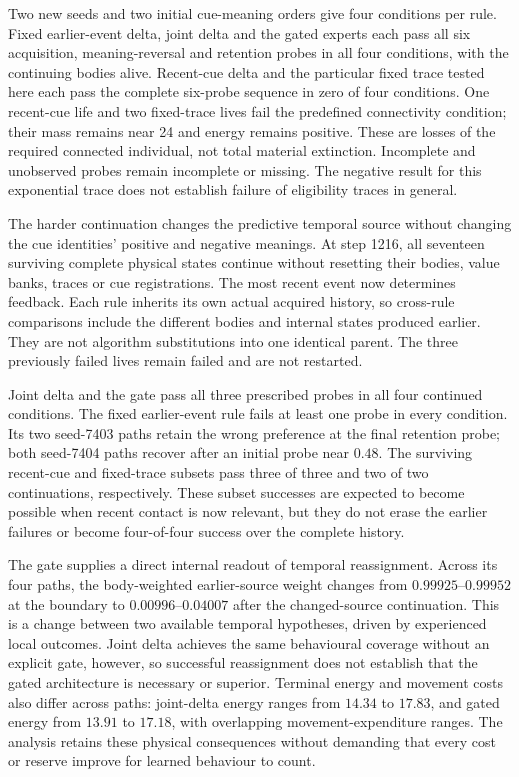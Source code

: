 Two new seeds and two initial cue-meaning orders give four conditions per rule. Fixed earlier-event delta, joint delta and the gated experts each pass all six acquisition, meaning-reversal and retention probes in all four conditions, with the continuing bodies alive. Recent-cue delta and the particular fixed trace tested here each pass the complete six-probe sequence in zero of four conditions. One recent-cue life and two fixed-trace lives fail the predefined connectivity condition; their mass remains near 24 and energy remains positive. These are losses of the required connected individual, not total material extinction. Incomplete and unobserved probes remain incomplete or missing. The negative result for this exponential trace does not establish failure of eligibility traces in general.

The harder continuation changes the predictive temporal source without changing the cue identities' positive and negative meanings. At step 1216, all seventeen surviving complete physical states continue without resetting their bodies, value banks, traces or cue registrations. The most recent event now determines feedback. Each rule inherits its own actual acquired history, so cross-rule comparisons include the different bodies and internal states produced earlier. They are not algorithm substitutions into one identical parent. The three previously failed lives remain failed and are not restarted.

Joint delta and the gate pass all three prescribed probes in all four continued conditions. The fixed earlier-event rule fails at least one probe in every condition. Its two seed-7403 paths retain the wrong preference at the final retention probe; both seed-7404 paths recover after an initial probe near $0.48$. The surviving recent-cue and fixed-trace subsets pass three of three and two of two continuations, respectively. These subset successes are expected to become possible when recent contact is now relevant, but they do not erase the earlier failures or become four-of-four success over the complete history.



The gate supplies a direct internal readout of temporal reassignment. Across its four paths, the body-weighted earlier-source weight changes from $0.99925$--$0.99952$ at the boundary to $0.00996$--$0.04007$ after the changed-source continuation. This is a change between two available temporal hypotheses, driven by experienced local outcomes. Joint delta achieves the same behavioural coverage without an explicit gate, however, so successful reassignment does not establish that the gated architecture is necessary or superior. Terminal energy and movement costs also differ across paths: joint-delta energy ranges from $14.34$ to $17.83$, and gated energy from $13.91$ to $17.18$, with overlapping movement-expenditure ranges. The analysis retains these physical consequences without demanding that every cost or reserve improve for learned behaviour to count.

